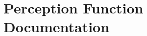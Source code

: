 \documentclass[main.tex]{subfiles}
\begin{document}
	\begingroup

	\renewcommand{\cleardoublepage}{}

	\renewcommand{\clearpage}{}

	\chapter{Perception Function Documentation}

		\chapterauthor{}
		
		
	\endgroup
\end{document}
